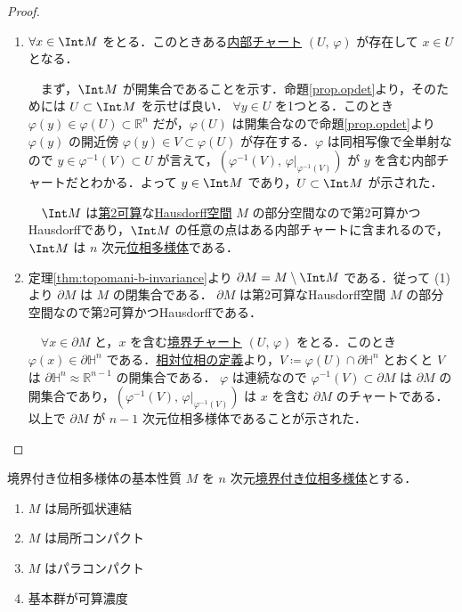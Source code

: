 \documentclass[geometry_main]{subfiles}
\begin{document}
\begin{proof}
	\begin{enumerate}
		\item $\forall x \in \Int M$ をとる．このときある\hyperref[de:int-manifold-with-boundary]{内部チャート} $(U,\, \varphi)$ が存在して $x \in U$ となる．
		
		　まず，$\Int M$ が開集合であることを示す．命題\ref{prop.opdet}より，そのためには $U \subset \Int M$ を示せば良い．
		$\forall y \in U$ を1つとる．このとき $\varphi(y) \in \varphi(U) \subset \mathbb{R}^n$ だが，$\varphi(U)$ は開集合なので命題\ref{prop.opdet}より $\varphi(y)$ の開近傍 $\varphi(y)  \in V \subset \varphi(U)$ が存在する．$\varphi$ は同相写像で全単射なので $y \in \varphi^{-1}(V) \subset U$ が言えて，$(\varphi^{-1}(V),\, \varphi|_{\varphi^{-1}(V)})$ が $y$ を含む内部チャートだとわかる．よって $y \in \Int M$ であり，$U \subset \Int M$ が示された．
		
		　$\Int M$ は\hyperref[def:second-countable]{第2可算}な\hyperref[def.separation]{Hausdorff空間} $M$ の部分空間なので第2可算かつHausdorffであり，$\Int M$ の任意の点はある内部チャートに含まれるので，$\Int M$ は $n$ 次元\hyperref[def.topomani]{位相多様体}である．
		\item 定理\ref{thm:topomani-b-invariance}より $\partial M = M \setminus \Int M$ である．従って (1) より $\partial M$ は $M$ の閉集合である．
		$\partial M$ は第2可算なHausdorff空間 $M$ の部分空間なので第2可算かつHausdorffである．
		
		　$\forall x \in \partial M$ と，$x$ を含む\hyperref[de:int-manifold-with-boundary]{境界チャート} $(U,\, \varphi)$ をとる．このとき $\varphi(x) \in \partial \mathbb{H}^{n}$ である．\hyperref[def.reltopo]{相対位相の定義}より，$V \coloneqq \varphi(U) \cap \partial \mathbb{H}^n$ とおくと $V$ は $\partial \mathbb{H}^n \approx \mathbb{R}^{n-1}$ の開集合である．
		$\varphi$ は連続なので $\varphi^{-1}(V) \subset \partial M$ は $\partial M$ の開集合であり，$(\varphi^{-1}(V),\, \varphi|_{\varphi^{-1}(V)})$ は $x$ を含む $\partial M$ のチャートである．以上で $\partial M$ が $n-1$ 次元位相多様体であることが示された．
	\end{enumerate}
\end{proof}

\begin{myprop}[label=prop:topomani-b-basic]{境界付き位相多様体の基本性質}
	$M$ を $n$ 次元\hyperref[def:mani-with-boundary]{境界付き位相多様体}とする．
	\begin{enumerate}
		\item $M$ は局所弧状連結
		\item $M$ は局所コンパクト
		\item $M$ はパラコンパクト
		\item 基本群が可算濃度
	\end{enumerate}
\end{myprop}
\end{document}

